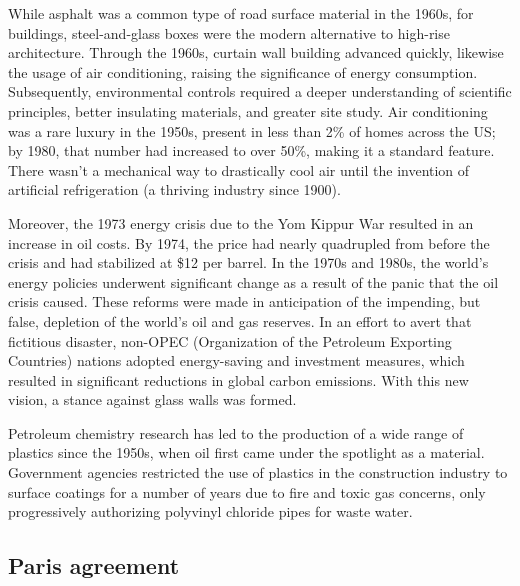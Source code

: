 While asphalt was a common type of road surface material in the 1960s,\autocite{elhacham2020global} for buildings, steel-and-glass boxes were the modern alternative to high-rise architecture. Through the 1960s, curtain wall building advanced quickly,\autocite{sharp2002twentieth} likewise the usage of air conditioning, raising the significance of energy consumption. Subsequently, environmental controls required a deeper understanding of scientific principles, better insulating materials, and greater site study.\autocite{jester2014twentieth} Air conditioning was a rare luxury in the 1950s, present in less than 2\% of homes across the US; by 1980, that number had increased to over 50\%, making it a standard feature.\autocite{biddle2008explaining} There wasn't a mechanical way to drastically cool air until the invention of artificial refrigeration (a thriving industry since 1900).\autocite{nagengast1999early}

Moreover, the 1973 energy crisis due to the Yom Kippur War resulted in an increase in oil costs. By 1974, the price had nearly quadrupled from before the crisis and had stabilized at \$12 per barrel.\autocite{ross20131973} In the 1970s and 1980s, the world's energy policies underwent significant change as a result of the panic that the oil crisis caused. These reforms were made in anticipation of the impending, but false, depletion of the world's oil and gas reserves. In an effort to avert that fictitious disaster, non-OPEC (Organization of the Petroleum Exporting Countries) nations adopted energy-saving and investment measures,\autocite{wagner2009organization} which resulted in significant reductions in global carbon emissions.\autocite{issawi19781973} With this new vision, a stance against glass walls was formed.\autocite{jester2014twentieth}

Petroleum chemistry research has led to the production of a wide range of plastics since the 1950s, when oil first came under the spotlight as a material.\autocite{krausmann2009growth} Government agencies restricted the use of plastics in the construction industry to surface coatings for a number of years due to fire and toxic gas concerns, only progressively authorizing polyvinyl chloride pipes for waste water.\autocite{koehler1955plastics}

\subsection{Paris agreement}
\label{sec:paris_agreement}

